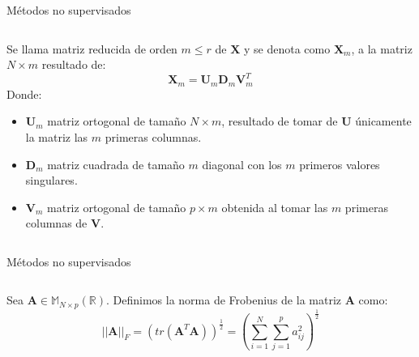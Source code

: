 \begin{frame}{Métodos no supervisados}
\begin{columns}
\begin{column}{0.9\textwidth}
\begin{defi}
Se llama matriz reducida de orden $m\leq r$ de $\textbf{X}$ y se denota como $\textbf{X}_m$, a la matriz $N\times m $ resultado de:
\begin{equation}
\textbf{X}_m=\textbf{U}_m\mathbf{D}_m\textbf{V}^T_m
\end{equation}
Donde:
\begin{itemize}
\item $\textbf{U}_m$ matriz ortogonal de tamaño $N \times m$, resultado de tomar de \textbf{U} únicamente la matriz las $m$ primeras columnas. 
\item $\mathbf{D}_m$  matriz cuadrada de tamaño $m$ diagonal con los $m$ primeros valores singulares. 
\item $\textbf{V}_m$ matriz ortogonal de tamaño $p \times m$ obtenida al tomar las $m$ primeras columnas de \textbf{V}.
\end{itemize}
\end{defi}
\end{column}
\end{columns}
\end{frame}

\begin{frame}{Métodos no supervisados}
\begin{columns}
\begin{column}{0.9\textwidth}

\begin{defi}
Sea $\textbf{A}\in \mathbb{M}_{N\times p}(\mathbb{R})$. Definimos la norma de Frobenius de la matriz \textbf{A} como:
\begin{equation}
||\textbf{A}||_F=(tr(\textbf{A}^T \textbf{A}))^{\frac{1}{2}}=\left(\sum_{i=1}^{N}\sum _{j=1}^{p}a_{ij}^2\right)^{\frac{1}{2}}
\end{equation}
\end{defi}
\end{column}
\end{columns}
\end{frame}


